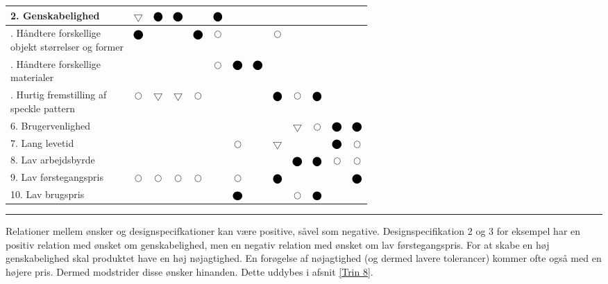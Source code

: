 \begin{table}[H]
\begin{tabular}{|p{}|c|c|c|c|c|c|c|c|c|c|c|c|}
    \hline
    \cellcolor{lightgray!20} 2. Genskabelighed & $\bigtriangledown$& $\blackbigcirc$ & $\blackbigcirc$ & & $\blackbigcirc$& & & & & &&\\
    \hline
    \cellcolor{lightgray!20} \makecell[l]{\addlinespace[0pt] 3. Håndtere forskellige \\ \quad objekt størrelser og former} \vspace{-10pt}  & $\blackbigcirc$& & & $\blackbigcirc$ &$\bigcirc$& & &$\bigcirc$& & & &\\
    \hline
    \cellcolor{lightgray!20} \makecell[l]{\addlinespace[0pt] 4. Håndtere forskellige \\ \quad materialer} \vspace{0pt} & & & & & $\bigcirc$ & $\blackbigcirc$& $\blackbigcirc$ & & & & & \\
    \hline
    \cellcolor{lightgray!20} \makecell[l]{\addlinespace[0pt]  5. Hurtig fremstilling af \\ \quad speckle pattern} \vspace{0pt} & $\bigcirc$& $\bigtriangledown$&$\bigtriangledown$& $\bigcirc$ & & &  & $\blackbigcirc$ & $\bigcirc$ & $\blackbigcirc$& & \\
    \hline
    \cellcolor{lightgray!20} 6. Brugervenlighed && & & & & & & & $\bigtriangledown$& $\bigcirc$ & $\blackbigcirc$ & $\blackbigcirc$ \\
    \hline
    \cellcolor{lightgray!20} 7. Lang levetid & & & & & & $\bigcirc$ & & $\bigtriangledown$& & &$\blackbigcirc$& $\bigcirc$ \\
    \hline
    \cellcolor{lightgray!20} 8. Lav arbejdsbyrde & & & & & & & & & $\blackbigcirc$ & $\blackbigcirc$ & $\bigcirc$& $\bigcirc$\\
    \hline
    \cellcolor{lightgray!20}  9. Lav førstegangspris&$\bigcirc$& $\bigcirc$& $\bigcirc$& $\bigcirc$& &$\bigcirc$ & & $\blackbigcirc$& & & & $\blackbigcirc$ \\
    \hline
    \cellcolor{lightgray!20} 10. Lav brugspris& & & & & & $\blackbigcirc$ & & & $\bigcirc$& $\blackbigcirc$& &  \\
    \hline
\end{tabular}
\end{table} \plainbreak{-0.5}

Relationer mellem ønsker og designspecifkationer kan være positive, såvel som negative. Designspecifikation 2 og 3 for eksempel har en positiv relation med ønsket om genskabelighed, men en negativ relation med ønsket om lav førstegangspris. For at skabe en høj genskabelighed skal produktet have en høj nøjagtighed. En forøgelse af nøjagtighed (og dermed lavere tolerancer) kommer ofte også med en højere pris. Dermed modstrider disse ønsker hinanden. Dette uddybes i afsnit \ref{Trin 8}.